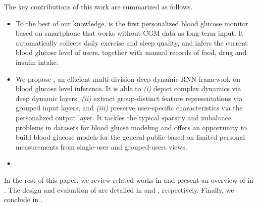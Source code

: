 The key contributions of this work are summarized as follows.
\begin{itemize}
  \item
  To the best of our knowledge, \sysname is the first personalized blood glucose monitor based on smartphone that works without CGM data as long-term input.
  It automatically collects daily exercise and sleep quality, and infers the current blood glucose level of users,  together with manual records of food, drug and insulin intake.
  \item
  We propose \modelname, an efficient multi-division deep dynamic RNN framework on blood glucose level inference. 
  It is able to \emph{(i)} depict complex dynamics via deep dynamic layers, \emph{(ii)} extract group-distinct feature representations via grouped input layers, and \emph{(iii)} preserve user-specific characteristics via the personalized output layer.
  It tackles the typical sparsity and imbalance problems in datasets for blood glucse modeling and offers an opportunity to build blood glucose models for the general public based on limited personal measurements from single-user and grouped-users views. 
  \item
\end{itemize}

In the rest of this paper, we review related works in  and present an overview of \sysname in .
The design and evaluation of \sysname are detailed in  and , respectively.
Finally, we conclude in .

